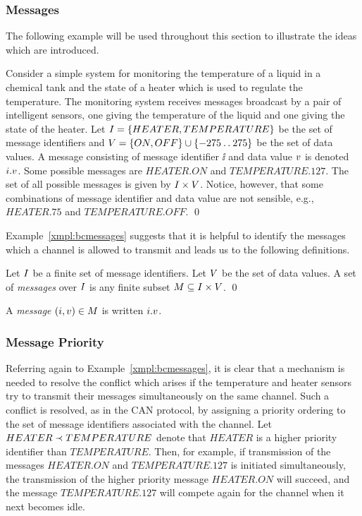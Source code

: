 \subsubsection{Messages}
The following example will be used throughout this section to illustrate
the ideas which are introduced.
\begin{exampleb}\label{xmpl:bcmessages}
Consider a simple system for monitoring the temperature of a liquid in
a chemical tank and the state of a heater which is used to regulate
the temperature. The monitoring system receives messages broadcast by
a pair of intelligent sensors, one giving the temperature of the
liquid and one giving the state of the heater.  Let $I = \{HEATER,
TEMPERATURE\}$ be the set of message identifiers and $V = \{ON, OFF\}
\cup \{-275 \mathbin{\ldotp\ldotp} 275\}$ be the set of data values. A message
consisting of message identifier $\ii$ and data value ${v}$ is denoted
${i}.{v}$. Some possible messages are $HEATER.ON$ and
$TEMPERATURE.127$. The set of all possible messages is given by $I
\times V$.  Notice, however, that some combinations of message
identifier and data value are not sensible, e.g., $HEATER.75$
and $TEMPERATURE.OFF$.
\qed
\end{exampleb}
 
Example~\ref{xmpl:bcmessages} suggests that it is helpful to identify the 
messages which a channel is allowed to transmit and leads us to the 
following definitions. 

\begin{definition}[Messages]
Let $I$ be a finite set of message identifiers. Let $V$ be the set
of data values. A set of \emph{messages} over $I$ is any finite
subset ${M} \subseteq I \times V$.
\qed
\end{definition}

\begin{notation}
A \emph{message} $({i},{v}) \in {M}$ is written ${i}.{v}$.
\end{notation}

\subsubsection{Message Priority}
Referring again to Example~\ref{xmpl:bcmessages}, it is clear that a
mechanism is needed to resolve the conflict which arises if the
temperature and heater sensors try to transmit their messages
simultaneously on the same channel. Such a conflict is resolved, as in
the CAN protocol, by assigning a priority ordering to the set of
message identifiers associated with the channel. Let $HEATER \prec
TEMPERATURE$ denote that $HEATER$ is a higher priority identifier than
$TEMPERATURE$.  Then, for example, if transmission of the messages
$HEATER.ON$ and \break $TEMPERATURE.127$ is initiated simultaneously, the
transmission of the higher priority message $HEATER.ON$ will succeed,
and the message \break $TEMPERATURE.127$ will compete again for the channel
when it next becomes idle.

